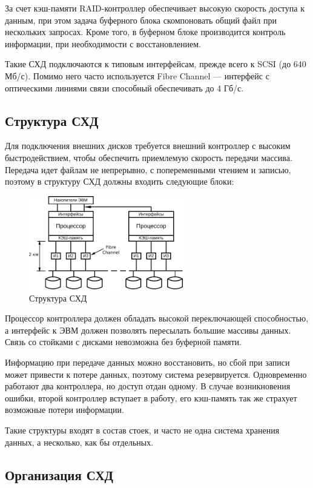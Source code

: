 \documentclass[unicode, 12pt, a4paper, oneside]{article}
\begin{document}
За счет кэш-памяти RAID-контроллер обеспечивает высокую скорость доступа к данным, при этом задача буферного блока скомпоновать общий файл при нескольких запросах. Кроме того, в буферном блоке производится контроль информации, при необходимости с восстановлением.

Такие СХД подключаются к типовым интерфейсам, прежде всего к SCSI (до 640 Мб/с). Помимо него часто используется Fibre Channel --- интерфейс с оптическими линиями связи способный обеспечивать до 4 Гб/с.

\subsection*{Структура СХД}

Для подключения внешних дисков требуется внешний контроллер с высоким быстродействием, чтобы обеспечить приемлемую скорость передачи массива. Передача идет файлам не непрерывно, с попеременными чтением и записью, поэтому в структуру СХД должны входить следующие блоки:

\begin{figure}[H]
\centering
\includegraphics[width=0.6\textwidth]{151_struct.pdf}
\caption{Структура СХД}
\end{figure}

Процессор контроллера должен обладать высокой переключающей способностью, а интерфейс к ЭВМ должен позволять пересылать большие массивы данных. Связь со стойками с дисками невозможна без буферной памяти.

Информацию при передаче данных можно восстановить, но сбой при записи может привести к потере данных, поэтому система резервируется. Одновременно работают два контроллера, но доступ отдан одному. В случае возникновения ошибки, второй контроллер вступает в работу, его кэш-память так же страхует возможные потери информации.

Такие структуры входят в состав стоек, и часто не одна система хранения данных, а несколько, как бы отдельных.

\subsection*{Организация СХД}
\end{document}
